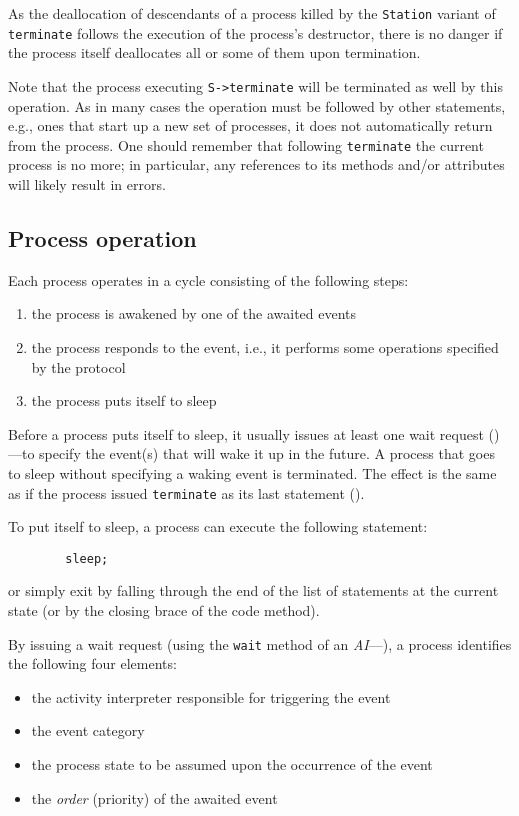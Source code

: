 As the deallocation of descendants of a process killed by the {\tt Station}
variant of {\tt terminate} follows the execution of the process's
destructor, there is no danger if the process itself deallocates all or
some of them upon termination.

Note that the process executing {\tt S->terminate} will be terminated as well
by this operation.
As in many cases the operation must be followed by other statements, e.g.,
ones that
start up a new set of processes, it does not automatically return from the
process.
One should remember that following {\tt terminate} the current
process is no more;
in particular, any references to its methods and/or attributes will likely
result in errors.

\subsection{Process operation}
\label{rm_pr_po}

Each process operates in a cycle consisting of the following steps:
\begin{enumerate}
\item
the process is awakened by one of the awaited events
\item
the process responds to the event, i.e., it performs some operations
specified by the protocol
\item
the process puts itself to sleep
\end{enumerate}

Before a process puts itself to sleep, it usually issues at least one
wait request ()---to specify the event(s) that will wake
it up in the future.
A process that goes to sleep without specifying a waking event is terminated.
The effect is the same
as if the process issued {\tt terminate} as its last
statement ().

To put itself to sleep, a process can execute
the following statement:
\begin{verbatim}
        sleep;
\end{verbatim}
or simply exit by falling through the end of the list of statements at the
current state (or by the closing brace of the code method).

By issuing a wait request (using the {\tt wait} method of an
{\em AI\/}---), a process identifies the following
four elements:
\begin{itemize}
\item
the activity interpreter responsible for triggering the event
\item
the event category
\item
the process state to be assumed upon the occurrence of the event
\item
the {\em order\/} (priority) of the awaited event
\end{itemize}

